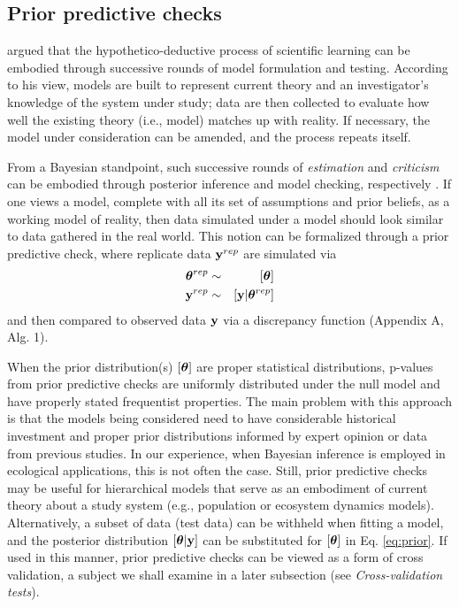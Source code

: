 \documentclass[12pt,english]{article}
\begin{document}
\begin{spacing}{1.9}
\subsection{Prior predictive checks}

\citet{Box1980} argued that the hypothetico-deductive process of scientific learning can be embodied through successive rounds of model formulation and testing. According to his view, models are built to represent current theory and an investigator's knowledge of the system under study; data are then collected to evaluate how well the existing theory (i.e., model) matches up with reality.  If necessary, the model under consideration can be amended, and the process repeats itself.

From a Bayesian standpoint, such successive rounds of \textit{estimation} and \textit{criticism} can be embodied through posterior inference and model checking, respectively \citep{Box1980}.
If one views a model, complete with all its set of assumptions and prior beliefs, as a working model of reality, then data simulated under a model should look similar to data gathered in the real world.  This notion can be formalized through a prior predictive check, where replicate data ${\bf y}^{rep}$ are simulated via
\begin{eqnarray}
   \label{eq:prior}
   \boldsymbol{\theta}^{rep} & \sim & [\boldsymbol{\theta}] \\
   {\bf y}^{rep} & \sim & [{\bf y}|\boldsymbol{\theta}^{rep}] \nonumber
\end{eqnarray}
and then compared to observed data ${\bf y}$ via a discrepancy function (Appendix A, Alg. 1).

When the prior distribution(s) $[\boldsymbol{\theta}]$ are proper statistical distributions, p-values from prior predictive checks are uniformly distributed under the null model and have properly stated frequentist properties.  The main problem with this approach is that the models being considered need to have considerable historical investment and proper prior distributions informed by expert opinion or data from previous studies.  In our experience, when Bayesian inference is employed in ecological applications, this is not often the case.  Still, prior predictive checks may be useful for hierarchical models that serve as an embodiment of current theory about a study system (e.g., population or ecosystem dynamics models).  Alternatively, a subset of data (test data) can be withheld when fitting a model, and the posterior distribution $[\boldsymbol{\theta}|{\bf y}]$ can be substituted for $[\boldsymbol{\theta}]$ in Eq. \ref{eq:prior}.  If used in this manner, prior predictive checks can be viewed as a form of cross validation, a subject we shall examine in a later subsection (see \textit{Cross-validation tests}).


\end{spacing}
\end{document}
